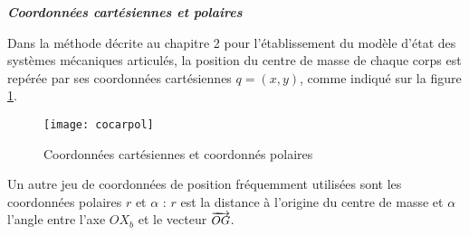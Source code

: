 \begin{exemple}{\bf \em Coordonnées cartésiennes et polaires}

Dans la méthode décrite au chapitre 2 pour l'établissement
du modèle d'état des systèmes mécaniques articulés, la
position du centre de masse de chaque corps est repérée par ses
coordonnées cartésiennes $q =(x,y)$, comme indiqué sur la figure
\ref{Fig:cocarpol}.
\begin{figure}[htbp] 
   \centering
   \texttt{[image: cocarpol]} 
   \caption{Coordonnées cartésiennes et coordonnés polaires}
   \label{Fig:cocarpol}
\end{figure}
Un autre jeu de coordonnées de position fréquemment utilisées
sont les coordonnées polaires $r$ et $\alpha$ : $r$ est la distance à l'origine du centre de masse et $\alpha$ l'angle entre l'axe $OX_b$ et le
vecteur $\small \overrightarrow{OG}$.


\end{exemple}
